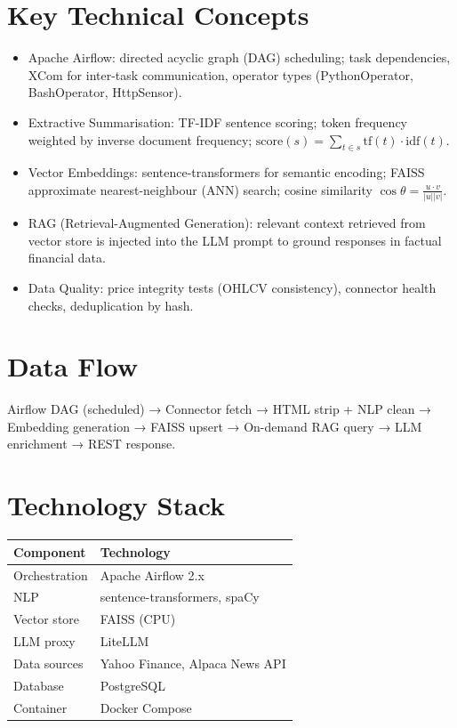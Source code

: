 \documentclass[11pt,a4paper]{article}
\begin{document}
\section{Key Technical Concepts}
\begin{itemize}[leftmargin=1.5em]
  \item Apache Airflow: directed acyclic graph (DAG) scheduling; task dependencies, XCom for inter-task communication, operator types (PythonOperator, BashOperator, HttpSensor).
  \item Extractive Summarisation: TF-IDF sentence scoring; token frequency weighted by inverse document frequency; $\text{score}(s) = \sum_{t \in s} \text{tf}(t) \cdot \text{idf}(t)$.
  \item Vector Embeddings: sentence-transformers for semantic encoding; FAISS approximate nearest-neighbour (ANN) search; cosine similarity $\cos\theta = \frac{u \cdot v}{|u||v|}$.
  \item RAG (Retrieval-Augmented Generation): relevant context retrieved from vector store is injected into the LLM prompt to ground responses in factual financial data.
  \item Data Quality: price integrity tests (OHLCV consistency), connector health checks, deduplication by hash.
\end{itemize}

\section{Data Flow}

Airflow DAG (scheduled) → Connector fetch → HTML strip + NLP clean →
Embedding generation → FAISS upsert →
On-demand RAG query → LLM enrichment → REST response.


\section{Technology Stack}

\begin{tabular}{ll}
\toprule
\textbf{Component} & \textbf{Technology} \\
\midrule
Orchestration & Apache Airflow 2.x \\
NLP & sentence-transformers, spaCy \\
Vector store & FAISS (CPU) \\
LLM proxy & LiteLLM \\
Data sources & Yahoo Finance, Alpaca News API \\
Database & PostgreSQL \\
Container & Docker Compose \\
\bottomrule
\end{tabular}
\end{document}
